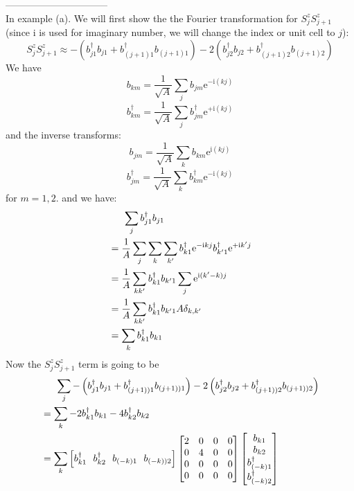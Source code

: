 \documentclass[letter]{article}
\newcommand{\e}{\mathrm{e}}
\newcommand{\ii}{\mathrm{i}}
\begin{document}
--------------------------------\\
In example (a). We will first show the the Fourier transformation for $S_j^z S_{j+1}^z$(since i is used for imaginary number, we will change the index or unit cell to $j$):\\
$$S_{j}^z S_{j+1}^z \approx-\left(b_{j1}^{\dagger}b_{j1}+b_{(j+1)1}^{\dagger}b_{(j+1)1}\right)-2\left(b_{j2}^{\dagger}b_{j2}+b_{(j+1)2}^{\dagger}b_{(j+1)2}\right)$$
We have $$
b_{km}=\frac{1}{\sqrt{A}}\sum_{j}b_{jm}\e^{-\ii (k j)}
$$$$
b^{\dagger}_{km}=\frac{1}{\sqrt{A}}\sum_{j}b_{jm}^{\dagger}\e^{+\ii (k j)}
$$
and the inverse transforms:$$
b_{jm}=\frac{1}{\sqrt{A}}\sum_{k}b_{km}\e^{\ii (k j)}
$$$$
b^{\dagger}_{jm}=\frac{1}{\sqrt{A}}\sum_{k}b_{km}^{\dagger}\e^{-\ii (k j)}
$$
for $m=1,2$. and we have:
$$\begin{aligned}
&\indent \sum_j b_{j1}^{\dagger}b_{j1} \\
&=\frac{1}{A}\sum_{j}\sum_{k}\sum_{k'}b_{k1}^{\dagger}\e^{-\ii kj}b_{k'1}^{\dagger}\e^{+\ii k'j}\\
&=\frac{1}{A}\sum_{kk'}b_{k1}^{\dagger}b_{k'1}\sum_{j}\e^{\ii(k'-k)j}\\
&=\frac{1}{A}\sum_{kk'}b_{k1}^{\dagger}b_{k'1} A \delta_{k,k'}\\
&=\sum_{k}b_{k1}^{\dagger}b_{k1}
\end{aligned}
$$
Now the $S_j^z S_{j+1}^z$ term is going to be$$\begin{aligned}
& \indent \sum_j -\left(b_{j1}^{\dagger}b_{j1}+b_{(j+1))1}^{\dagger}b_{(j+1))1}\right)-2\left(b_{j2}^{\dagger}b_{j2}+b_{(j+1))2}^{\dagger}b_{(j+1))2}\right)\\
&= \sum_{k}-2b_{k1}^{\dagger}b_{k1}-4b_{k2}^{\dagger}b_{k2}\\
&=\sum_k \left[
    b_{k1}^{\dagger} \ \ 
    b_{k2}^{\dagger}\  \ 
    b_{(-k)1}\ \ 
    b_{(-k))2}\right]
   \begin{bmatrix}
        2 & 0 & 0 & 0 \\
       0 &  4 & 0 &0 \\
       0 &  0 & 0 &0\\
        0 & 0 & 0& 0
        \end{bmatrix}\begin{bmatrix}
            b_{k1}  \\
            b_{k2}  \\
            b_{(-k)1}^{\dagger}\\
            b_{(-k)2}^{\dagger}
            \end{bmatrix}
\end{aligned}
$$
\end{document}
